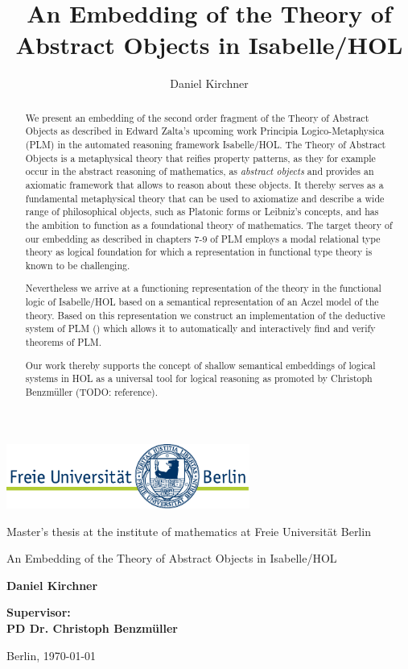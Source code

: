\documentclass[a4paper,enabledeprecatedfontcommands]{scrreprt}
\title{An Embedding of the Theory of Abstract Objects in Isabelle/HOL}
\author{Daniel Kirchner}
\numberwithin{remark}{chapter}
\numberwithin{TODO}{chapter}
\begin{document}
\begin{titlepage}
\vspace{1cm}

\begin{center}
    \includegraphics[width=0.6\textwidth]{logo}
    \vspace{1cm}


Master's thesis at the institute of mathematics at Freie Universit\"at Berlin

    \vspace{2cm}


    \Large{\textsf{An Embedding of the Theory of Abstract Objects in Isabelle/HOL}}

    \vspace{2cm}

    \large{\textbf{Daniel Kirchner}}

    \vspace{2cm}

    \large{\textbf{
        Supervisor:\\
PD Dr. Christoph Benzm\"uller
    }}

    \vspace{2cm}
    \large{Berlin, \today}
\end{center}
\end{titlepage}
\begin{abstract}
	We present an embedding of the second order fragment of the Theory of Abstract Objects as described in Edward Zalta's
  upcoming work Principia Logico-Metaphysica (PLM\cite{PM}) in the automated reasoning framework Isabelle/HOL. The Theory of Abstract
  Objects is a metaphysical theory that reifies property patterns, as they for example occur in the abstract reasoning
  of mathematics, as \emph{abstract objects} and provides an axiomatic framework that allows to reason about these objects.
  It thereby serves as a fundamental metaphysical theory that can be used to axiomatize and describe a wide range of philosophical
  objects, such as Platonic forms or Leibniz's concepts, and has the ambition to function as a foundational theory of mathematics.
  The target theory of our embedding as described in chapters 7-9 of PLM\cite{PM} employs a modal relational type theory as
  logical foundation for which a representation in functional type theory is known to be challenging\cite{rtt}.
  
  Nevertheless we arrive at a functioning representation of the theory in the functional logic of Isabelle/HOL based on a semantical
  representation of an Aczel model of the theory. Based on this representation we construct an implementation of the deductive
  system of PLM (\cite[Chap. 9]{PM}) which allows it to automatically and interactively find and verify theorems of PLM.

  Our work thereby supports the concept of shallow semantical embeddings of
  logical systems in HOL as a universal tool for logical reasoning as
  promoted by Christoph Benzm\"uller (TODO: reference).

\end{abstract}
\end{document}
